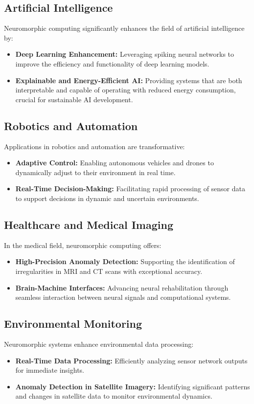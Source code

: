 \documentclass{article}
\theoremstyle{plain}
\begin{document}
\subsection{Artificial Intelligence}
Neuromorphic computing significantly enhances the field of artificial intelligence by:
\begin{itemize}
    \item \textbf{Deep Learning Enhancement:} Leveraging spiking neural networks to improve the efficiency and functionality of deep learning models.
    \item \textbf{Explainable and Energy-Efficient AI:} Providing systems that are both interpretable and capable of operating with reduced energy consumption, crucial for sustainable AI development.
\end{itemize}

\subsection{Robotics and Automation}
Applications in robotics and automation are transformative:
\begin{itemize}
    \item \textbf{Adaptive Control:} Enabling autonomous vehicles and drones to dynamically adjust to their environment in real time.
    \item \textbf{Real-Time Decision-Making:} Facilitating rapid processing of sensor data to support decisions in dynamic and uncertain environments.
\end{itemize}

\subsection{Healthcare and Medical Imaging}
In the medical field, neuromorphic computing offers:
\begin{itemize}
    \item \textbf{High-Precision Anomaly Detection:} Supporting the identification of irregularities in MRI and CT scans with exceptional accuracy.
    \item \textbf{Brain-Machine Interfaces:} Advancing neural rehabilitation through seamless interaction between neural signals and computational systems.
\end{itemize}

\subsection{Environmental Monitoring}
Neuromorphic systems enhance environmental data processing:
\begin{itemize}
    \item \textbf{Real-Time Data Processing:} Efficiently analyzing sensor network outputs for immediate insights.
    \item \textbf{Anomaly Detection in Satellite Imagery:} Identifying significant patterns and changes in satellite data to monitor environmental dynamics.
\end{itemize}
\end{document}
